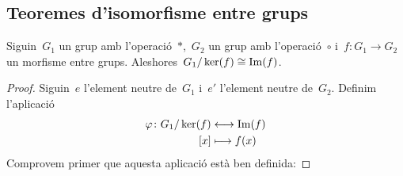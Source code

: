 \documentclass[../../main.tex]{subfiles}
\begin{document}
    \subsection{Teoremes d'isomorfisme entre grups}
    \begin{theorem}
        \label{thm:Teorema fonamental dels isomorfismes}%
            Siguin~\(G_{1}\) un grup amb l'operació~\(\ast\),~\(G_{2}\) un grup amb l'operació~\(\circ\) i~\(f\colon G_{1}\to G_{2}\) un morfisme entre grups.
            Aleshores~\(G_{1}/\operatorname{ker}(f)\cong\operatorname{Im}(f)\).
        \begin{proof}
            Siguin~\(e\) l'element neutre de~\(G_{1}\) i~\(e'\) l'element neutre de~\(G_{2}\).
            Definim l'aplicació
            \begin{align}
            \label{eq:8}
            \varphi\colon G_{1}/\operatorname{ker}(f)&\longleftrightarrow\operatorname{Im}(f)\\
            [x]&\longmapsto f(x)\nonumber
            \end{align}
            Comprovem primer que aquesta aplicació està ben definida:


\end{proof}
\end{theorem}
\end{document}
